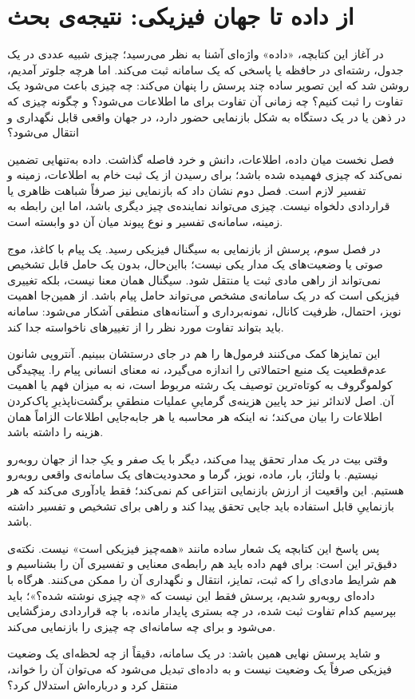\chapter*{از داده تا جهان فیزیکی: نتیجه‌ی بحث}

در آغاز این کتابچه، «داده» واژه‌ای آشنا به نظر می‌رسید؛ چیزی شبیه عددی در یک جدول، رشته‌ای در حافظه یا پاسخی که یک سامانه ثبت می‌کند. اما هرچه جلوتر آمدیم، روشن شد که این تصویر ساده چند پرسش را پنهان می‌کند: چه چیزی باعث می‌شود یک تفاوت را ثبت کنیم؟ چه زمانی آن تفاوت برای ما اطلاعات می‌شود؟ و چگونه چیزی که در ذهن یا در یک دستگاه به شکل بازنمایی حضور دارد، در جهان واقعی قابل نگهداری و انتقال می‌شود؟

فصل نخست میان داده، اطلاعات، دانش و خرد فاصله گذاشت. داده به‌تنهایی تضمین نمی‌کند که چیزی فهمیده شده باشد؛ برای رسیدن از یک ثبت خام به اطلاعات، زمینه و تفسیر لازم است. فصل دوم نشان داد که بازنمایی نیز صرفاً شباهت ظاهری یا قراردادی دلخواه نیست. چیزی می‌تواند نماینده‌ی چیز دیگری باشد، اما این رابطه به زمینه، سامانه‌ی تفسیر و نوع پیوند میان آن دو وابسته است.

در فصل سوم، پرسش از بازنمایی به سیگنال فیزیکی رسید. یک پیام با کاغذ، موج صوتی یا وضعیت‌های یک مدار یکی نیست؛ بااین‌حال، بدون یک حامل قابل تشخیص نمی‌تواند از راهی مادی ثبت یا منتقل شود. سیگنال همان معنا نیست، بلکه تغییری فیزیکی است که در یک سامانه‌ی مشخص می‌تواند حامل پیام باشد. از همین‌جا اهمیت نویز، احتمال، ظرفیت کانال، نمونه‌برداری و آستانه‌های منطقی آشکار می‌شود: سامانه باید بتواند تفاوت مورد نظر را از تغییرهای ناخواسته جدا کند.

این تمایزها کمک می‌کنند فرمول‌ها را هم در جای درستشان ببینیم. آنتروپی شانون عدم‌قطعیت یک منبع احتمالاتی را اندازه می‌گیرد، نه معنای انسانی پیام را. پیچیدگی کولموگروف به کوتاه‌ترین توصیف یک رشته مربوط است، نه به میزان فهم یا اهمیت آن. اصل لاندائر نیز حد پایین هزینه‌ی گرماییِ عملیات منطقیِ برگشت‌ناپذیرِ پاک‌کردن اطلاعات را بیان می‌کند؛ نه اینکه هر محاسبه یا هر جابه‌جایی اطلاعات الزاماً همان هزینه را داشته باشد.

وقتی بیت در یک مدار تحقق پیدا می‌کند، دیگر با یک صفر و یکِ جدا از جهان روبه‌رو نیستیم. با ولتاژ، بار، ماده، نویز، گرما و محدودیت‌های یک سامانه‌ی واقعی روبه‌رو هستیم. این واقعیت از ارزش بازنمایی انتزاعی کم نمی‌کند؛ فقط یادآوری می‌کند که هر بازنماییِ قابل استفاده باید جایی تحقق پیدا کند و راهی برای تشخیص و تفسیر داشته باشد.

پس پاسخ این کتابچه یک شعار ساده مانند «همه‌چیز فیزیکی است» نیست. نکته‌ی دقیق‌تر این است: برای فهم داده باید هم رابطه‌ی معنایی و تفسیری آن را بشناسیم و هم شرایط مادی‌ای را که ثبت، تمایز، انتقال و نگهداری آن را ممکن می‌کنند. هرگاه با داده‌ای روبه‌رو شدیم، پرسش فقط این نیست که «چه چیزی نوشته شده؟»؛ باید بپرسیم کدام تفاوت ثبت شده، در چه بستری پایدار مانده، با چه قراردادی رمزگشایی می‌شود و برای چه سامانه‌ای چه چیزی را بازنمایی می‌کند.

و شاید پرسش نهایی همین باشد: در یک سامانه، دقیقاً از چه لحظه‌ای یک وضعیت فیزیکی صرفاً یک وضعیت نیست و به داده‌ای تبدیل می‌شود که می‌توان آن را خواند، منتقل کرد و درباره‌اش استدلال کرد؟
